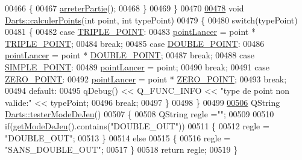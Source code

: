 \begin{DoxyCode}
00466     \{
00467         \hyperlink{class_darts_aa9685f754172d995cdd04d39d9651227}{arreterPartie}();
00468     \}
00469 \}
00470 
\hyperlink{class_darts_a6a6c58dee559e851709d76fef9a8c6da}{00478} \textcolor{keywordtype}{void} \hyperlink{class_darts_a6a6c58dee559e851709d76fef9a8c6da}{Darts::calculerPoints}(\textcolor{keywordtype}{int} point, \textcolor{keywordtype}{int} typePoint)
00479 \{
00480     \textcolor{keywordflow}{switch}(typePoint)
00481     \{
00482         \textcolor{keywordflow}{case} \hyperlink{darts_8h_a1bd6caead3e7edd423f064b3af34e486}{TRIPLE\_POINT}:
00483             \hyperlink{class_darts_a7ed0e6c9c07930603f85c2bac5b9d78b}{pointLancer} = point * \hyperlink{darts_8h_a1bd6caead3e7edd423f064b3af34e486}{TRIPLE\_POINT};
00484         \textcolor{keywordflow}{break};
00485         \textcolor{keywordflow}{case} \hyperlink{darts_8h_af67ad443603f4dddf225d062757614ca}{DOUBLE\_POINT}:
00486             \hyperlink{class_darts_a7ed0e6c9c07930603f85c2bac5b9d78b}{pointLancer} = point * \hyperlink{darts_8h_af67ad443603f4dddf225d062757614ca}{DOUBLE\_POINT};
00487         \textcolor{keywordflow}{break};
00488         \textcolor{keywordflow}{case} \hyperlink{darts_8h_a180cfdf433b8c9594f209d3c71c7c992}{SIMPLE\_POINT}:
00489             \hyperlink{class_darts_a7ed0e6c9c07930603f85c2bac5b9d78b}{pointLancer} = point;
00490         \textcolor{keywordflow}{break};
00491         \textcolor{keywordflow}{case}  \hyperlink{darts_8h_a02bea0ce22b1e13c5065f434182317fb}{ZERO\_POINT}:
00492             \hyperlink{class_darts_a7ed0e6c9c07930603f85c2bac5b9d78b}{pointLancer} = point * \hyperlink{darts_8h_a02bea0ce22b1e13c5065f434182317fb}{ZERO\_POINT};
00493         \textcolor{keywordflow}{break};
00494         \textcolor{keywordflow}{default}:
00495             qDebug() << Q\_FUNC\_INFO << \textcolor{stringliteral}{"type de point non valide:"} << typePoint;
00496         \textcolor{keywordflow}{break};
00497     \}
00498 \}
00499 
\hyperlink{class_darts_ad6535ce917119069ec099cea0e744971}{00506} QString \hyperlink{class_darts_ad6535ce917119069ec099cea0e744971}{Darts::testerModeDeJeu}()
00507 \{
00508     QString regle =\textcolor{stringliteral}{""};
00509 
00510     \textcolor{keywordflow}{if}(\hyperlink{class_darts_a49ea4ca23fd03d80f5a95257c6fe8478}{getModeDeJeu}().contains(\textcolor{stringliteral}{"DOUBLE\_OUT"}))
00511     \{
00512         regle = \textcolor{stringliteral}{"DOUBLE\_OUT"};
00513     \}
00514     \textcolor{keywordflow}{else}
00515     \{
00516         regle = \textcolor{stringliteral}{"SANS\_DOUBLE\_OUT"};
00517     \}
00518     \textcolor{keywordflow}{return} regle;
00519 \}
\end{DoxyCode}
